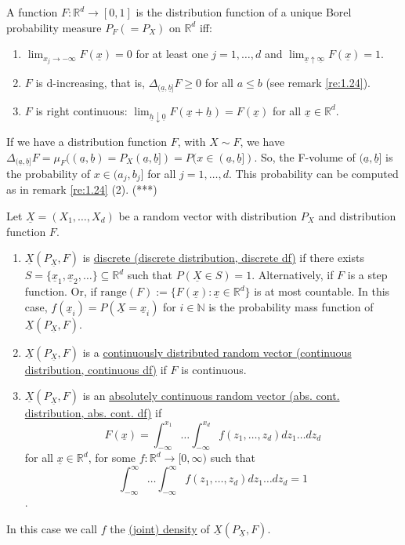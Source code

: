 \documentclass{article}
\newcommand{\R}{\mathbb{R}}
\newcommand{\N}{\mathbb{N}}
\begin{document}
	\begin{mythm}{}{}
		A function $F : \R^d\to[0, 1]$ is the distribution function of a unique Borel probability measure $P_F(=P_X)$ on $\R^d$ iff:
		\begin{enumerate}[label=(\roman*)]
			\item $\lim_{x_j\to-\infty}F(\underline{x})=0$ for at least one $j=1, \dots, d$ and $\lim_{\underline{x}\uparrow\underline{\infty}}F(\underline{x})=1$.
			
			\item $F$ is d-increasing, that is, $\Delta_{(\underline{a}, \underline{b}]}F\geq0$ for all $a\leq b$ (see remark \ref{re:1.24}).
			
			\item $F$ is right continuous: $\lim_{\underline{h}\downarrow\underline{0}}F(\underline{x}+\underline{h})=F(\underline{x})$ for all $\underline{x}\in\R^d$.
		\end{enumerate}
		
		If we have a distribution function $F$, with $X\sim F$, we have $\Delta_{(\underline{a}, \underline{b}]}F=\mu_F((\underline{a}, \underline{b})=P_X(\underline{a}, \underline{b}])=P(x\in(\underline{a}, \underline{b}])$. So, the F-volume of $(\underline{a}, \underline{b}]$ is the probability of $x\in(a_j, b_j]$ for all $j=1, \dots, d$. This probability can be computed as in remark \ref{re:1.24} (2). (***)
	\end{mythm}
	
	\begin{mydef}{}{}
		Let $\underline{X}=(X_1, \dots, X_d)$ be a random vector with distribution $P_X$ and distribution function $F$.
		\begin{enumerate}
			\item $\underline{X}(P_{\underline{X}}, F)$ is \ul{discrete (discrete distribution, discrete df)} if there exists $S=\{\underline{x}_1, \underline{x}_2, \dots\}\subseteq \R^d$ such that $P(\underline{X}\in S)=1$. Alternatively, if $F$ is a step function. Or, if $\mbox{range}(F):=\{F(\underline{x}) : \underline{x}\in \R^d\}$ is at most countable. In this case, $f(\underline{x}_i)=P(\underline{X}=\underline{x}_i)$ for $i\in\N$ is the probability mass function of $\underline{X}(P_{\underline{X}}, F)$.
			
			\item $\underline{X}(P_{\underline{X}}, F)$ is a \ul{continuously distributed random vector (continuous distribution, continuous df)} if $F$ is continuous.
			
			\item $\underline{X}(P_{\underline{X}}, F)$ is an \ul{absolutely continuous random vector (abs. cont. distribution, abs. cont. df)} if $$F(\underline{x})=\int_{-\infty}^{x_1}\dots\int_{-\infty}^{x_d}f(z_1, \dots, z_d)dz_1\dots dz_d$$ for all $\underline{x}\in\R^d$, for some $f : \R^d\to[0, \infty)$ such that $$\int_{-\infty}^{\infty}\dots\int_{-\infty}^{\infty}f(z_1, \dots, z_d)dz_1\dots dz_d=1$$.				\end{enumerate}
			
		In this case we call $f$ the \ul{(joint) density} of $\underline{X}(P_{\underline{X}}, F)$.
	\end{mydef}
	
\end{document}
